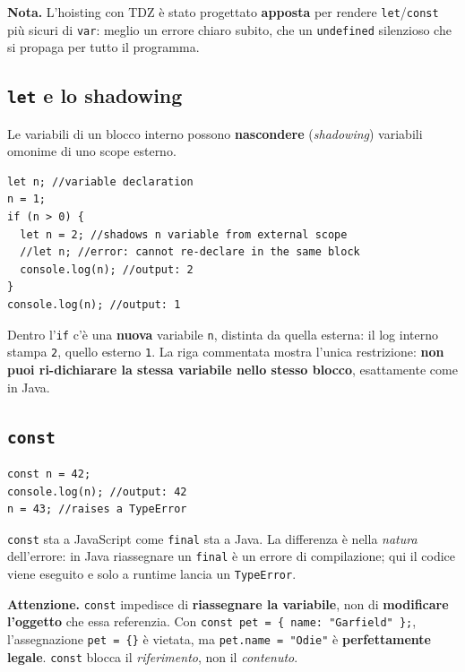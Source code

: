 \documentclass[10pt,a4paper]{article}
\newcommand{\avviso}[1]{\textbf{\textcolor{wamber}{Attenzione.}} #1}
\newcommand{\nota}[1]{\textbf{\textcolor{ngreen}{Nota.}} #1}
\begin{document}
\begin{notebox}
\nota{L'hoisting con TDZ è stato progettato \textbf{apposta} per rendere \texttt{let}/\texttt{const} più sicuri di \texttt{var}: meglio un errore chiaro subito, che un \texttt{undefined} silenzioso che si propaga per tutto il programma.}
\end{notebox}

\subsection{\texttt{let} e lo shadowing}

Le variabili di un blocco interno possono \textbf{nascondere} (\emph{shadowing}) variabili omonime di uno scope esterno.

\begin{lstlisting}[style=js]
let n; //variable declaration
n = 1;
if (n > 0) {
  let n = 2; //shadows n variable from external scope
  //let n; //error: cannot re-declare in the same block
  console.log(n); //output: 2
}
console.log(n); //output: 1
\end{lstlisting}

Dentro l'\texttt{if} c'è una \textbf{nuova} variabile \texttt{n}, distinta da quella esterna: il log interno stampa \texttt{2}, quello esterno \texttt{1}. La riga commentata mostra l'unica restrizione: \textbf{non puoi ri-dichiarare la stessa variabile nello stesso blocco}, esattamente come in Java.

\subsection{\texttt{const}}

\begin{lstlisting}[style=js]
const n = 42;
console.log(n); //output: 42
n = 43; //raises a TypeError
\end{lstlisting}

\texttt{const} sta a JavaScript come \texttt{final} sta a Java. La differenza è nella \emph{natura} dell'errore: in Java riassegnare un \texttt{final} è un errore di compilazione; qui il codice viene eseguito e solo a runtime lancia un \texttt{TypeError}.

\begin{warnbox}
\avviso{\texttt{const} impedisce di \textbf{riassegnare la variabile}, non di \textbf{modificare l'oggetto} che essa referenzia. Con \texttt{const pet = \{ name: "Garfield" \};}, l'assegnazione \texttt{pet = \{\}} è vietata, ma \texttt{pet.name = "Odie"} è \textbf{perfettamente legale}. \texttt{const} blocca il \emph{riferimento}, non il \emph{contenuto}.}
\end{warnbox}
\end{document}
